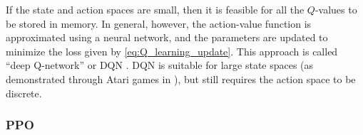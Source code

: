 If the state and action spaces are small, then it is feasible for all the $Q$-values to be stored in memory. In general, however, the action-value function is approximated using a neural network, and the parameters are updated to minimize the loss given by \ref{eq:Q_learning_update}. This approach is called ``deep Q-network'' or DQN \cite{mnih2013playing}. DQN is suitable for large state spaces (as demonstrated through Atari games in \cite{mnih2013playing}), but still requires the action space to be discrete.

%

\subsubsection{PPO}

